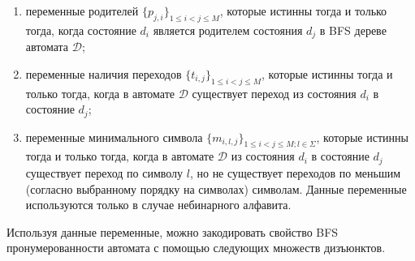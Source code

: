 \begin{enumerate}
  \item переменные родителей $\{p_{j,i}\}_{1 \leq i < j \leq M}$, которые истинны тогда и только тогда, когда состояние $d_i$ является родителем состояния $d_j$ в BFS дереве автомата $\mathcal{D}$;
  \item переменные наличия переходов $\{t_{i,j}\}_{1 \leq i < j \leq M}$, которые истинны тогда и только тогда, когда в автомате $\mathcal{D}$ существует переход из состояния $d_{i}$ в состояние $d_{j}$;
  \item переменные минимального символа $\{m_{i,l,j}\}_{1 \leq i < j \leq M;l \in \Sigma}$, которые истинны тогда и только тогда, когда в автомате $\mathcal{D}$ из состояния $d_{i}$ в состояние $d_{j}$ существует переход по символу $l$, но не существует переходов по меньшим (согласно выбранному порядку на символах) символам.
  Данные переменные используются только в случае небинарного алфавита.
\end{enumerate}

Используя данные переменные, можно закодировать свойство BFS пронумерованности автомата с помощью следующих множеств дизъюнктов.

